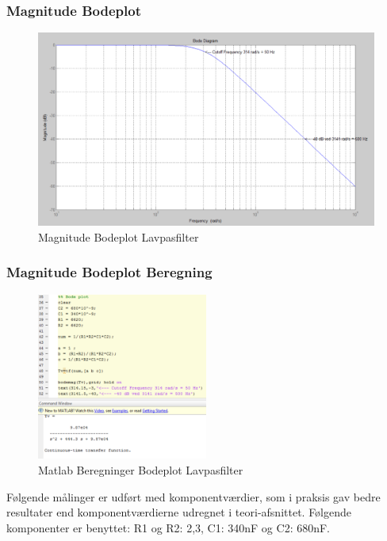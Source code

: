 \subsubsection{Magnitude Bodeplot}
\begin{figure}[H]
	\centering
	\includegraphics[width=1\textwidth]{Figurer/Bodeplot_Lavpasfilter_Teoretisk}
	\caption{Magnitude Bodeplot Lavpasfilter}
	\label{fig:Bodeplot}
\end{figure}

\subsubsection{Magnitude Bodeplot Beregning}
\begin{figure}[H]
	\centering
	\includegraphics[width=0.5\textwidth]{Figurer/Beregninger_Bodeplot_teoretisk}
	\caption{Matlab Beregninger Bodeplot Lavpasfilter}
	\label{fig:Bodeplot Beregning}
\end{figure}


Følgende målinger er udført med komponentværdier, som i praksis gav bedre resultater end komponentværdierne udregnet i teori-afsnittet. Følgende komponenter er benyttet: 
R1 og R2: 2,3, C1: 340nF og C2: 680nF. 

